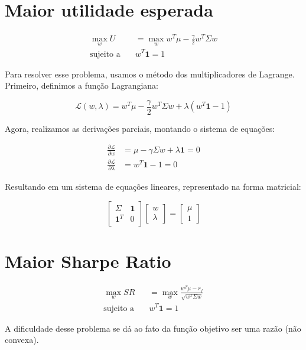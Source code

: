 \documentclass[a4paper,10pt]{article}
\begin{document}
\section*{Maior utilidade esperada}

\begin{equation*}
    \begin{aligned}
        \max_{w} U &= \max_{w} w^{T} \mu - \frac{\gamma}{2} w^{T} \Sigma w \\
        \text{sujeito a} \quad & w^{T} \mathbf{1} = 1
    \end{aligned}
\end{equation*}

Para resolver esse problema, usamos o método dos multiplicadores de Lagrange. Primeiro, definimos a função Lagrangiana:

\begin{equation*}
    \mathcal{L}(w, \lambda) = w^{T} \mu - \frac{\gamma}{2} w^{T} \Sigma w + \lambda (w^{T} \mathbf{1} - 1)
\end{equation*}

Agora, realizamos as derivações parciais, montando o sistema de equações:

\begin{equation*}
    \begin{aligned}
        \frac{\partial \mathcal{L}}{\partial w} &= \mu - \gamma \Sigma w + \lambda \mathbf{1} = 0 \\
        \frac{\partial \mathcal{L}}{\partial \lambda} &= w^{T} \mathbf{1} - 1 = 0
    \end{aligned}
\end{equation*}

Resultando em um sistema de equações lineares, representado na forma matricial:

\begin{equation*}
    \begin{bmatrix}
        \Sigma & \mathbf{1} \\
        \mathbf{1}^{T} & 0
    \end{bmatrix}
    \begin{bmatrix}
        w \\
        \lambda
    \end{bmatrix}
    =
    \begin{bmatrix}
        \mu \\
        1
    \end{bmatrix}
\end{equation*}

\section*{Maior Sharpe Ratio}

\begin{equation*}
    \begin{aligned}
        \max_{w} SR &= \max_{w} \frac{w^{T} \mu - r_{f}}{\sqrt{w^{T} \Sigma w}} \\
        \text{sujeito a} \quad & w^{T} \mathbf{1} = 1
    \end{aligned}
\end{equation*}

A dificuldade desse problema se dá ao fato da função objetivo ser uma razão (não convexa).
\end{document}

